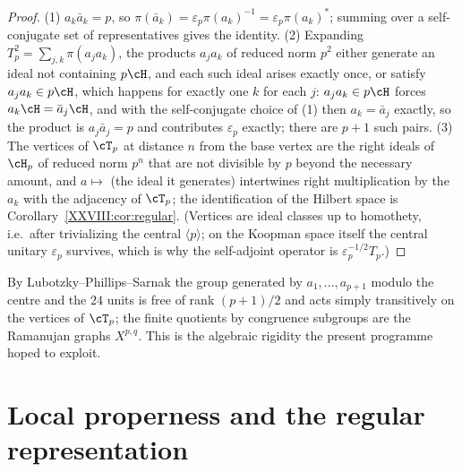 \begin{proof}
(1) $a_k\bar a_k=p$, so $\pi(\bar a_k)=\varepsilon_p\pi(a_k)^{-1}=\varepsilon_p\pi(a_k)^*$;
summing over a self-conjugate set of representatives gives the identity. (2) Expanding
$T_p^2=\sum_{j,k}\pi(a_ja_k)$, the products $a_ja_k$ of reduced norm $p^2$ either generate an ideal
not containing $p\cH$, and each such ideal arises exactly once, or satisfy $a_ja_k\in p\cH$, which
happens for exactly one $k$ for each $j$: $a_ja_k\in p\cH$ forces $a_k\cH=\bar a_j\cH$, and
with the self-conjugate choice of (1) then $a_k=\bar a_j$ exactly, so the product is
$a_j\bar a_j=p$ and contributes $\varepsilon_p$ exactly; there are $p+1$ such pairs. (3) The vertices of $\cT_p$ at distance $n$ from the base vertex are
the right ideals of $\cH_p$ of reduced norm $p^n$ that are not divisible by $p$ beyond the
necessary amount, and $a\mapsto$ (the ideal it generates) intertwines right multiplication by the
$a_k$ with the adjacency of $\cT_p$; the identification of the Hilbert space is
Corollary~\ref{XXVIII:cor:regular}. (Vertices are ideal classes up to homothety, i.e.\ after
trivializing the central $\langle p\rangle$; on the Koopman space itself the central unitary
$\varepsilon_p$ survives, which is why the self-adjoint operator is
$\varepsilon_p^{-1/2}T_p$.)
\end{proof}

\begin{remark}
By Lubotzky--Phillips--Sarnak the group generated by $a_1,\dots,a_{p+1}$ modulo the centre and the
$24$ units is free of rank $(p+1)/2$ and acts simply transitively on the vertices of $\cT_p$; the
finite quotients by congruence subgroups are the Ramanujan graphs $X^{p,q}$. This is the algebraic
rigidity the present programme hoped to exploit.
\end{remark}

\section{Local properness and the regular representation}\label{XXVIII:sec:proper}

